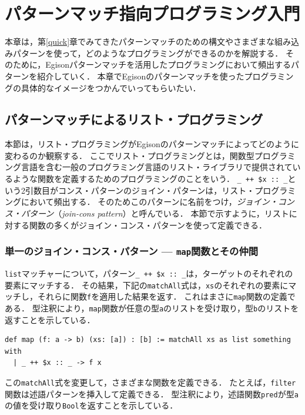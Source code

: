 \chapter{パターンマッチ指向プログラミング入門}\label{pmo}

本章は，第\ref{quick}章でみてきたパターンマッチのための構文やさまざまな組み込みパターンを使って，どのようなプログラミングができるのかを解説する．
そのために，Egisonパターンマッチを活用したプログラミングにおいて頻出するパターンを紹介していく．
本章でEgisonのパターンマッチを使ったプログラミングの具体的なイメージをつかんでいってもらいたい．

\section{パターンマッチによるリスト・プログラミング}

本節は，リスト・プログラミングがEgisonのパターンマッチによってどのように変わるのか観察する．
ここでリスト・プログラミングとは，関数型プログラミング言語を含む一般のプログラミング言語のリスト・ライブラリで提供されているような関数を定義するためのプログラミングのことをいう．
\lstinline{_ ++ $x :: _}という2引数目がコンス・パターンのジョイン・パターンは，リスト・プログラミングにおいて頻出する．
そのためこのパターンに名前をつけ，\emph{ジョイン・コンス・パターン}（\emph{join-cons pattern}）と呼んでいる．
本節で示すように，リストに対する関数の多くがジョイン・コンス・パターンを使って定義できる．

\subsection{単一のジョイン・コンス・パターン --- \texttt{map}関数とその仲間}

\lstinline{list}マッチャーについて，パターン\lstinline|_ ++ $x :: _|は，ターゲットのそれぞれの要素にマッチする．
その結果，下記の\lstinline{matchAll}式は，\lstinline{xs}のそれぞれの要素にマッチし，それらに関数\lstinline{f}を適用した結果を返す．
これはまさに\lstinline{map}関数の定義である．
型注釈により，\lstinline{map}関数が任意の型\lstinline{a}のリストを受け取り，型\lstinline{b}のリストを返すことを示している．

\begin{lstlisting}[language=egison,numbers=none]
def map (f: a -> b) (xs: [a]) : [b] := matchAll xs as list something with
  | _ ++ $x :: _ -> f x
\end{lstlisting}

この\lstinline{matchAll}式を変更して，さまざまな関数を定義できる．
たとえば，\lstinline{filter}関数は述語パターンを挿入して定義できる．
型注釈により，述語関数\lstinline{pred}が型\lstinline{a}の値を受け取り\lstinline{Bool}を返すことを示している．

